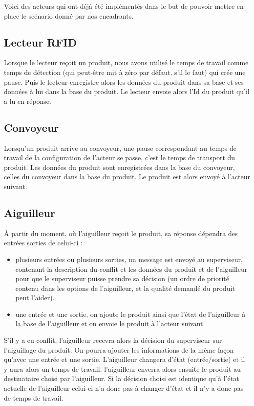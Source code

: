 \documentclass[12pt,a4paper]{article}
\begin{document}
		Voici des acteurs qui ont déjà été implémentés dans le but de pouvoir 
		mettre en place le scénario donné par nos encadrants.

		\subsection{Lecteur RFID}
		 	Lorsque le lecteur reçoit un produit, nous avons utilisé le temps
		 	de travail comme temps de détection (qui peut-être mit à zéro par
		 	défaut, s'il le faut) qui crée une pause.
		 	Puis le lecteur enregistre alors les données du produit dans 
		 	sa base et ses données à lui dans la base du produit. 
		 	Le lecteur envoie alors l'Id du produit qu'il a lu en réponse.
		 
		\subsection{Convoyeur}
			Lorsqu'un produit arrive au convoyeur, une pause correspondant au
			temps de travail de la configuration de l'acteur se passe, c'est
			le temps de transport du produit. Les données du produit sont 
			enregistrées dans la base du convoyeur, celles du convoyeur dans la 
			base du produit. Le produit est alors envoyé à l'acteur suivant.

		\subsection{Aiguilleur}
			À partir du moment, où l'aiguilleur reçoit le produit, sa réponse 
			dépendra des entrées sorties de celui-ci : 

			\begin{itemize}
				\item plusieurs entrées ou plusieurs sorties, un message est 
					envoyé au superviseur, contenant la description du conflit 
					et les données du produit et de l'aiguilleur pour que le 
					superviseur puisse prendre sa décision (un ordre de 
					priorité contenu dans les options de l'aiguilleur, et la 
					qualité demandé du produit peut l'aider).
				\item une entrée et une sortie, on ajoute le produit ainsi que 
					l'état de l'aiguilleur à la base de l'aiguilleur et on 
					envoie le produit à l'acteur suivant.
			\end{itemize}
			
			S'il y a eu conflit, l'aiguilleur recevra alors la décision du 
			superviseur sur l'aiguillage du produit. On pourra ajouter les 
			informations de la même façon qu'avec une entrée et une sortie. 
			L'aiguilleur changera d'état (entrée/sortie) et il y aura alors un 
			temps de travail. l'aiguilleur enverra alors ensuite le produit au 
			destinataire choisi par l'aiguilleur. Si la décision choisi est 
			identique qu'à l'état actuelle de l'aiguilleur celui-ci n'a donc pas 
			à changer d'état et il n'y a donc pas de temps de travail.
\end{document}

